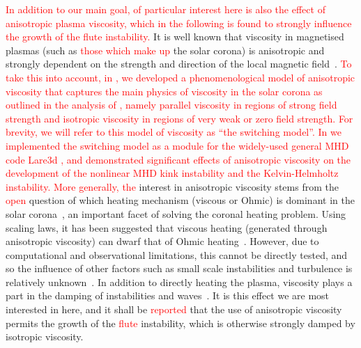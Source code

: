 \documentclass[12pt]{article}
\newcommand{\rs}[2]{\textcolor{red}{#2}}
\begin{document}
\rs{}{In addition to our main goal, of particular interest here is
also the effect of anisotropic plasma viscosity, which in the following is found to
strongly influence the growth of the \rs{fluting}{flute} instability.}
It is well known that viscosity in magnetised plasmas (such as
\rs{that which makes up}{those which make up} the solar corona) is
anisotropic and strongly dependent on the strength and direction of
the local magnetic
field~\cite{hollwegViscosityChewGoldbergerLowEquations1986,hollwegViscosityMagnetizedPlasma1985,braginskiiTransportProcessesPlasma1965}.
\rs{}{To take this into account, in \cite{mactaggartBraginskiiMagnetohydrodynamicsArbitrary2017},
we developed a phenomenological model of anisotropic viscosity that
captures the main physics of viscosity in the 
solar corona as outlined in the analysis of
\cite{braginskiiTransportProcessesPlasma1965}, namely parallel
viscosity in regions of strong field  strength and isotropic viscosity
in regions of very weak or zero field strength. For brevity, we will
refer to this model of viscosity as ``the switching model''. In
\cite{quinnEffectAnisotropicViscosity2020,quinnKelvinHelmholtzInstabilityCollapse2021} we implemented
the switching model as a module for the widely-used general MHD code
Lare3d \cite{arberStaggeredGridLagrangian2001}, and demonstrated
significant effects of anisotropic viscosity on the 
development of the nonlinear MHD kink instability and the
Kelvin-Helmholtz instability.} \rs{The}{More generally, the} interest in
anisotropic viscosity stems from the \rs{unanswered}{open} question of
which heating mechanism (viscous or Ohmic) is dominant in the solar
corona~\cite{klimchukSolvingCoronalHeating2006}, an important facet
of solving the coronal heating problem. Using scaling laws, it has
been suggested that viscous heating (generated through anisotropic
viscosity) can dwarf that of Ohmic
heating~\cite{craigAnisotropicViscousDissipation2009a,litvinenkoViscousEnergyDissipation2005}.
However,
due to computational and observational limitations, this cannot be
directly tested, and so the influence of other factors such as small
scale instabilities and turbulence is relatively
unknown~\cite{klimchukSolvingCoronalHeating2006}. In addition to
directly heating the plasma, viscosity plays a part in the damping of
instabilities and waves~\cite{rudermanSlowSurfaceWave2000}. It is
this effect we are most interested in here, and it shall be \rs{found}{reported} that
the use of anisotropic viscosity permits the growth of the
\rs{fluting}{flute} instability, which is otherwise strongly damped by
isotropic viscosity. 
\end{document}
